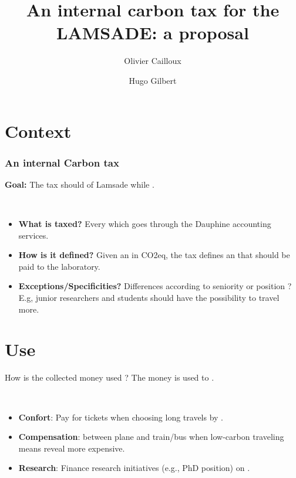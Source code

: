 \documentclass[french, english]{beamer}
\title[Proposal for a tax]{An internal carbon tax for the LAMSADE: a proposal}
\author{Olivier Cailloux \and Hugo Gilbert}
\institute[LAMSADE]{LAMSADE, Université Paris-Dauphine, PSL}
\date{\formatdate{11}{10}{2022}}
\begin{document}
\begin{frame}[plain]
	\titlepage
\end{frame}
\addtocounter{framenumber}{-1}

\section{Context}





\frame
{
  \frametitle{An internal Carbon tax}

\textbf{Goal:} The tax should  of Lamsade while . 

\

  \begin{itemize}
  \item \textbf{What is taxed?} Every  which goes through the Dauphine accounting services.
  \item \textbf{How is it defined?} Given an  in CO2eq, the tax defines an  that should be paid to the laboratory.
  \item \textbf{Exceptions/Specificities?} Differences according to seniority or position ? E.g, junior researchers and students should have the possibility to travel more.
  \end{itemize}
}

\section{Use}
\begin{frame}{How is the collected money used ?}
The money is used to .

\

\begin{itemize} 
    \item \textbf{Confort}: Pay for  tickets when choosing long travels by . 
    \item \textbf{Compensation}:  between plane and train/bus when low-carbon traveling means reveal more expensive.  
    \item \textbf{Research}: Finance research initiatives (e.g., PhD position) on .
\end{itemize}	
\end{frame}
\end{document}
